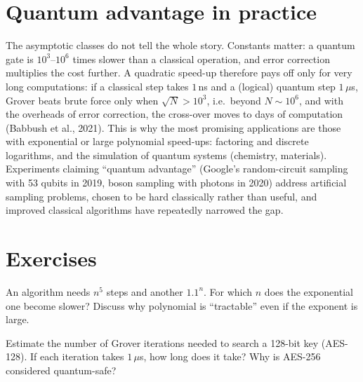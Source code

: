 \section{Quantum advantage in practice}
The asymptotic classes do not tell the whole story. Constants matter: a quantum gate is $10^3$--$10^6$ times slower than a classical operation, and error correction multiplies the cost further. A quadratic
speed-up therefore pays off only for very long computations: if a classical step takes $1$\,ns and a (logical) quantum step $1\,\mu$s, Grover beats brute force only when $\sqrt N>10^3$, i.e.\ beyond $N\sim10^6$,
and with the overheads of error correction, the cross-over moves to days of computation (Babbush et al., 2021). This is why the most promising applications are those with exponential or large polynomial speed-ups:
factoring and discrete logarithms, and the simulation of quantum systems (chemistry, materials). Experiments claiming ``quantum advantage'' (Google's random-circuit sampling with 53 qubits in 2019, boson sampling with
photons in 2020) address artificial sampling problems, chosen to be hard classically rather than useful, and improved classical algorithms have repeatedly narrowed the gap.

\section{Exercises}
\begin{exercise}
An algorithm needs $n^5$ steps and another $1.1^n$. For which $n$ does the exponential one become slower? Discuss why polynomial is ``tractable'' even if the exponent is large.
\end{exercise}
\begin{exercise}
Estimate the number of Grover iterations needed to search a 128-bit key (AES-128). If each iteration takes $1\,\mu$s, how long does it take? Why is AES-256 considered quantum-safe?
\end{exercise}
